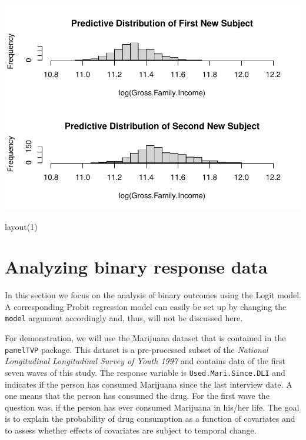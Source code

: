 \documentclass[a4paper, preprint, 3p,
authoryear]{elsarticle} %
\newenvironment{Shaded}{\begin{snugshade}}{\end{snugshade}}
\newcommand{\NormalTok}[1]{#1}
\newcommand{\pandocbounded}[1]{#1}
\begin{document}
\pandocbounded{\includegraphics[keepaspectratio]{Vignette-for-panelTVP_files/figure-latex/unnamed-chunk-28-1.pdf}}

\begin{Shaded}
\begin{Highlighting}[]
\NormalTok{layout(1)}
\end{Highlighting}
\end{Shaded}

\section{Analyzing binary response
data}\label{analyzing-binary-response-data}

In this section we focus on the analysis of binary outcomes using the
Logit model. A corresponding Probit regression model can easily be set
up by changing the \texttt{model} argument accordingly and, thus, will
not be discussed here.

For demonstration, we will use the Marijuana dataset that is contained
in the \texttt{panelTVP} package. This dataset is a pre-processed subset
of the \textit{National Longitudinal Longitudinal Survey of Youth 1997}
and contains data of the first seven waves of this study. The response
variable is \texttt{Used.Mari.Since.DLI} and indicates if the person has
consumed Marijuana since the last interview date. A one means that the
person has consumed the drug. For the first wave the question was, if
the person has ever consumed Marijuana in his/her life. The goal is to
explain the probability of drug consumption as a function of covariates
and to assess whether effects of covariates are subject to temporal
change.
\end{document}
